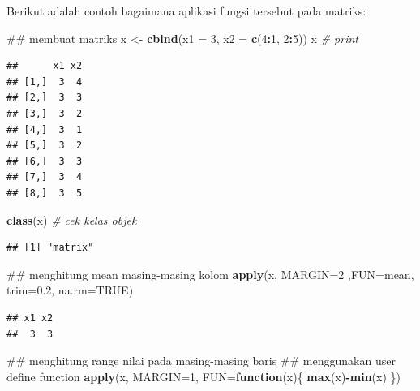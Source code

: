 \documentclass[]{book}
\newenvironment{Shaded}{\begin{snugshade}}{\end{snugshade}}
\newcommand{\KeywordTok}[1]{\textcolor[rgb]{0.13,0.29,0.53}{\textbf{#1}}}
\newcommand{\DataTypeTok}[1]{\textcolor[rgb]{0.13,0.29,0.53}{#1}}
\newcommand{\DecValTok}[1]{\textcolor[rgb]{0.00,0.00,0.81}{#1}}
\newcommand{\FloatTok}[1]{\textcolor[rgb]{0.00,0.00,0.81}{#1}}
\newcommand{\StringTok}[1]{\textcolor[rgb]{0.31,0.60,0.02}{#1}}
\newcommand{\CommentTok}[1]{\textcolor[rgb]{0.56,0.35,0.01}{\textit{#1}}}
\newcommand{\OtherTok}[1]{\textcolor[rgb]{0.56,0.35,0.01}{#1}}
\newcommand{\ControlFlowTok}[1]{\textcolor[rgb]{0.13,0.29,0.53}{\textbf{#1}}}
\newcommand{\OperatorTok}[1]{\textcolor[rgb]{0.81,0.36,0.00}{\textbf{#1}}}
\newcommand{\NormalTok}[1]{#1}
\begin{document}
Berikut adalah contoh bagaimana aplikasi fungsi tersebut pada matriks:

\begin{Shaded}
\begin{Highlighting}[]
\NormalTok{## membuat matriks}
\NormalTok{x <-}\StringTok{ }\KeywordTok{cbind}\NormalTok{(}\DataTypeTok{x1 =} \DecValTok{3}\NormalTok{, }\DataTypeTok{x2 =} \KeywordTok{c}\NormalTok{(}\DecValTok{4}\OperatorTok{:}\DecValTok{1}\NormalTok{, }\DecValTok{2}\OperatorTok{:}\DecValTok{5}\NormalTok{))}
\NormalTok{x }\CommentTok{# print}
\end{Highlighting}
\end{Shaded}

\begin{verbatim}
##      x1 x2
## [1,]  3  4
## [2,]  3  3
## [3,]  3  2
## [4,]  3  1
## [5,]  3  2
## [6,]  3  3
## [7,]  3  4
## [8,]  3  5
\end{verbatim}

\begin{Shaded}
\begin{Highlighting}[]
\KeywordTok{class}\NormalTok{(x) }\CommentTok{# cek kelas objek}
\end{Highlighting}
\end{Shaded}

\begin{verbatim}
## [1] "matrix"
\end{verbatim}

\begin{Shaded}
\begin{Highlighting}[]
\NormalTok{## menghitung mean masing-masing kolom}
\KeywordTok{apply}\NormalTok{(x, }\DataTypeTok{MARGIN=}\DecValTok{2}\NormalTok{ ,}\DataTypeTok{FUN=}\NormalTok{mean, }\DataTypeTok{trim=}\FloatTok{0.2}\NormalTok{, }\DataTypeTok{na.rm=}\OtherTok{TRUE}\NormalTok{)}
\end{Highlighting}
\end{Shaded}

\begin{verbatim}
## x1 x2 
##  3  3
\end{verbatim}

\begin{Shaded}
\begin{Highlighting}[]
\NormalTok{## menghitung range nilai pada masing-masing baris}
\NormalTok{## menggunakan user define function}
\KeywordTok{apply}\NormalTok{(x, }\DataTypeTok{MARGIN=}\DecValTok{1}\NormalTok{,}
      \DataTypeTok{FUN=}\ControlFlowTok{function}\NormalTok{(x)\{}
        \KeywordTok{max}\NormalTok{(x)}\OperatorTok{-}\KeywordTok{min}\NormalTok{(x)}
\NormalTok{      \})}
\end{Highlighting}
\end{Shaded}
\end{document}

